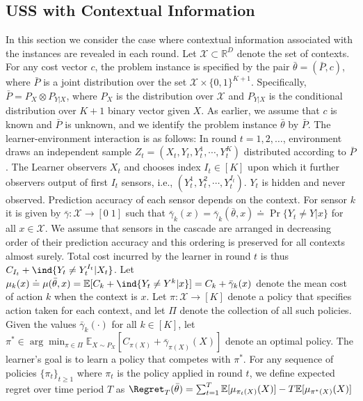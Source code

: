\subsection{USS with Contextual Information } 
In this section we consider the case where contextual information associated with the instances are revealed in each round.  Let $\mathcal{X}\subset \mathbb{R}^D$ denote the set of contexts. For any cost vector $c$, the problem instance is specified by the pair $\bar{\theta}=(\bar{P},c)$, where $\bar{P}$ is a joint distribution over the set $\mathcal{X}\times\{0,1\}^{K+1}$. Specifically, $\bar{P}=P_{X}\otimes P_{Y|X}$, where $P_X$ is the distribution over $\mathcal{X}$ and $P_{Y|X}$ is the conditional distribution over $K+1$ binary vector given $X$. As earlier, we assume that $c$ is known and $\bar{P}$  is unknown, and we identify the problem instance $\bar{\theta}$ by $\bar{P}$. The learner-environment interaction is as follows: In  round $t=1,2,\ldots$, environment draws an independent sample  $Z_t=(X_t, Y_t, Y_t^1, \cdots,Y_t^K)$ distributed according to $\bar{P}$. The Learner observers $X_t$ and chooses index $I_t \in [K]$ upon which it further observers output of first $I_t$ sensors, i.e., $(Y_t^1, Y_t^2, \cdots, Y_t^{I_t})$. $Y_t$ is hidden and never observed.  Prediction accuracy of each sensor depends on the context. For sensor $k$ it is given by  $\bar{\gamma}: \mathcal{X}\rightarrow [0\;1]$ such that $\bar{\gamma}_k(x)=\bar{\gamma}_k(\bar{\theta},x)\doteq\Pr\{Y_t \neq Y | x\}$ for all $x\in \mathcal{X}$. We assume that sensors in the cascade are arranged in decreasing order of their prediction accuracy and this ordering is preserved for all contexts almost surely. Total cost incurred by the learner in round $t$ is thus $C_{I_t}+\ind{Y_t\neq Y_t^{I_t}|X_t}$. Let $\mu_k(x)\doteq \mu(\bar{\theta},x)=\mathbb{E}[C_k +\ind{Y_t\neq Y^{k}|x}]=C_k + \bar{\gamma}_k(x)$ denote the mean cost of action $k$ when the context is $x$. Let $\pi: \mathcal{X}\rightarrow [K]$ denote a policy that specifies action taken for each context, and let $\Pi$ denote the collection of all such policies. Given the values $\bar{\gamma}_k(\cdot)$ for all $k \in [K]$, let
$\pi^*\in \arg\min_{\pi \in \Pi} \mathbb{E}_{X \sim P_X}[C_{\pi(X)}+\bar{\gamma}_{\pi(X)}(X)]$ denote an optimal policy. The learner's goal is to learn a policy that competes with $\pi^*$. For any sequence of policies $\{\pi_t\}_{t\geq 1}$ where $\pi_t$ is the policy applied in round $t$, we define expected regret over time period $T$ as $\Regret_T(\bar{\theta})=\sum_{t=1}^T \mathbb{E}[\mu_{\pi_t(X)}(X)]- T\mathbb{E}[\mu_{\pi^*(X)}(X)]$


